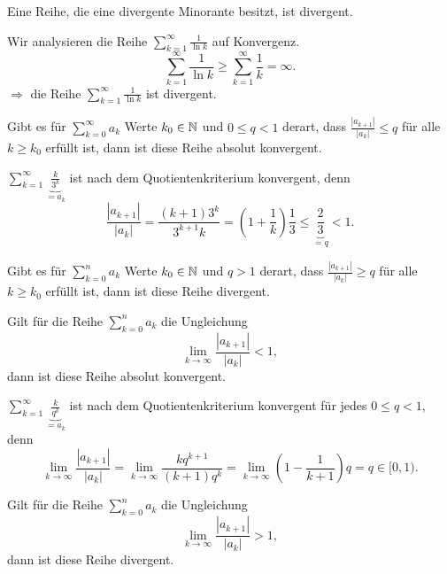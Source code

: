 \begin{thm}[Minorantenkriterium]
	Eine Reihe, die eine divergente Minorante besitzt, ist divergent. 
\end{thm} 

\begin{bsp} 
	Wir analysieren die Reihe $\sum_{k=1}^\infty \frac{1}{\ln k}$ auf Konvergenz. 
	\[
		\sum_{k=1}^\infty \frac{1}{\ln k} \ge \sum_{k=1}^\infty \frac{1}{k} = \infty. 
	\]
	$\Rightarrow$ die Reihe $\sum_{k=1}^\infty \frac{1}{\ln k}$ ist divergent. 
\end{bsp} 

\begin{thm} 
	Gibt es für $\sum_{k=0}^\infty a_k$ Werte $k_0 \in \mathbb{N}$ und $0 \le q < 1$ derart, dass $\frac{|a_{k+1}|}{|a_k|} \le q$ für alle $k \ge k_0$ erfüllt ist, dann ist diese Reihe absolut konvergent. 
\end{thm} 

\begin{bsp} 
	$\sum_{k=1}^\infty \underbrace{\frac{k}{3^k}}_{= a_k}$ ist nach dem Quotientenkriterium konvergent, denn 
	\[
		\frac{|a_{k+1}|}{|a_k|} = \frac{(k+1) 3^k }{3^{k+1} k} = \left( 1 + \frac{1}{k} \right) \frac{1}{3} \le \underbrace{\frac{2}{3}}_{= q} < 1. 
	\]
\end{bsp} 

\begin{thm} 
	Gibt es für $\sum_{k=0}^n a_k$  Werte $k_0 \in \mathbb{N}$ und $q> 1$ derart, dass $\frac{|a_{k+1}|}{|a_k|} \ge q$ für alle $k \ge k_0$ erfüllt ist, dann ist diese Reihe divergent. 
\end{thm} 

\begin{thm}
	Gilt für die Reihe $\sum_{k=0}^n a_k$ die Ungleichung 
	\[
		\lim_{k \to \infty} \frac{|a_{k+1}|}{|a_k|} < 1,
	\]
	dann ist diese Reihe absolut konvergent. 
\end{thm} 

\begin{bsp}
	$\sum_{k=1}^\infty \underbrace{ \frac{k}{q^k} }_{=a_k}$ ist nach dem Quotientenkriterium konvergent für jedes $0 \le q < 1$, denn
	\[
		\lim_{k \to \infty} \frac{|a_{k+1}|}{|a_k|} = \lim_{k \to \infty} \frac{k q^{k+1}}{(k+1) q^k } = \lim_{k \to \infty} \left( 1 - \frac{1}{k+1} \right) q = q \in [0,1).
	\]
\end{bsp} 

\begin{thm}
	Gilt für die Reihe $\sum_{k=0}^n a_k$ die Ungleichung 
	\[
	\lim_{k \to \infty} \frac{|a_{k+1}|}{|a_k|} > 1,
	\]
	dann ist diese Reihe divergent. 
\end{thm} 

